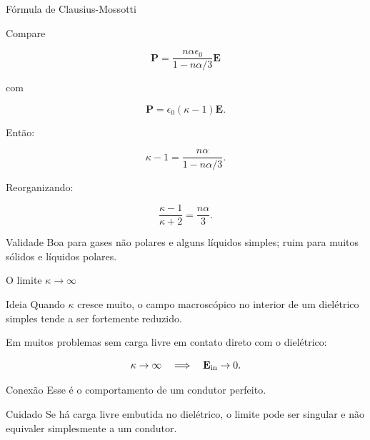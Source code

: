\documentclass[aspectratio=169]{beamer}
\begin{document}
\begin{frame}{Fórmula de Clausius-Mossotti}

\footnotesize

Compare

\[
\mathbf P
=
\frac{n\alpha\epsilon_0}{1-n\alpha/3}\mathbf E
\]

com

\[
\mathbf P=\epsilon_0(\kappa-1)\mathbf E.
\]

Então:

\[
\kappa-1
=
\frac{n\alpha}{1-n\alpha/3}.
\tag{6.83}
\]

Reorganizando:

\begin{eqbox}
\begin{equation}
\frac{\kappa-1}{\kappa+2}
=
\frac{n\alpha}{3}.
\tag{6.84}
\label{eq:clausius-mossotti}
\end{equation}
\end{eqbox}

\begin{alertblock}{Validade}
Boa para gases não polares e alguns líquidos simples; ruim para muitos sólidos
e líquidos polares.
\end{alertblock}

\end{frame}

\begin{frame}{O limite \(\kappa\to\infty\)}

\small

\begin{mybox}{Ideia}
Quando \(\kappa\) cresce muito, o campo macroscópico no interior de um dielétrico
simples tende a ser fortemente reduzido.
\end{mybox}

Em muitos problemas sem carga livre em contato direto com o dielétrico:

\[
\kappa\to\infty
\quad \Longrightarrow \quad
\mathbf E_{\rm in}\to 0.
\]

\begin{alertblock}{Conexão}
Esse é o comportamento de um condutor perfeito.
\end{alertblock}

\begin{mybox}{Cuidado}
Se há carga livre embutida no dielétrico, o limite pode ser singular e não
equivaler simplesmente a um condutor.
\end{mybox}

\end{frame}
\end{document}
